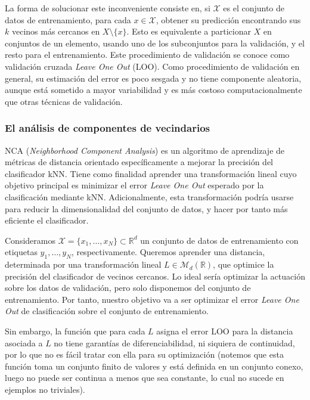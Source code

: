 \documentclass{book}
\begin{document}
La forma de solucionar este inconveniente consiste en, si $\mathcal{X}$ es el conjunto de datos de entrenamiento, para cada $x \in \mathcal{X}$, obtener su predicción encontrando sus $k$ vecinos más cercanos en $X  \setminus \{x\}$. Esto es equivalente a particionar $X$ en conjuntos de un elemento, usando uno de los subconjuntos para la validación, y el resto para el entrenamiento. Este procedimiento de validación se conoce como validación cruzada \emph{Leave One Out} (LOO). Como procedimiento de validación en general, su estimación del error es poco sesgada y no tiene componente aleatoria, aunque está sometido a mayor variabilidad y es más costoso computacionalmente que otras técnicas de validación.

\subsubsection{El análisis de componentes de vecindarios}

NCA (\emph{Neighborhood Component Analysis}) \cite{nca} es un algoritmo de aprendizaje de métricas de distancia orientado específicamente a mejorar la precisión del clasificador kNN. Tiene como finalidad aprender una transformación lineal cuyo objetivo principal es minimizar el error \emph{Leave One Out} esperado por la clasificación mediante kNN. Adicionalmente, esta transformación podría usarse para reducir la dimensionalidad del conjunto de datos, y hacer por tanto más eficiente el clasificador.
	
Consideramos $\mathcal{X} = \{x_1,\dots,x_N\} \subset \mathbb{R}^d$ un conjunto de datos de entrenamiento con etiquetas $y_1,\dots,y_N$, respectivamente. Queremos aprender una distancia, determinada por una transformación lineal $L \in \mathcal{M}_{d}(\mathbb{R})$, que optimice la precisión del clasificador de vecinos cercanos. Lo ideal sería optimizar la actuación sobre los datos de validación, pero solo disponemos del conjunto de entrenamiento. Por tanto, nuestro objetivo va a ser optimizar el error \emph{Leave One Out} de clasificación sobre el conjunto de entrenamiento.

Sin embargo, la función que para cada $L$ asigna el error LOO para la distancia asociada a $L$ no tiene garantías de diferenciabilidad, ni siquiera de continuidad, por lo que no es fácil tratar con ella para su optimización (notemos que esta función toma un conjunto finito de valores y está definida en un conjunto conexo, luego no puede ser continua a menos que sea constante, lo cual no sucede en ejemplos no triviales).
\end{document}
